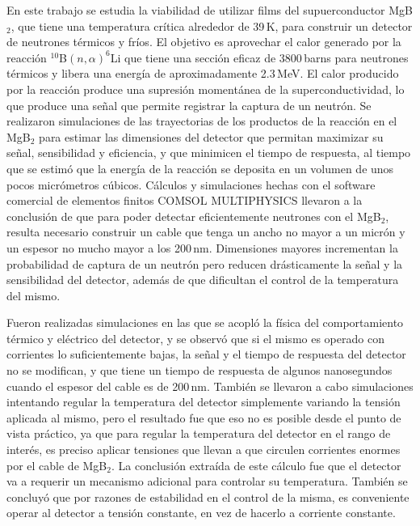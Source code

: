 \begin{resumen}%
  En este trabajo se estudia la viabilidad de utilizar films del supuerconductor MgB$_2$, que tiene una temperatura crítica alrededor de 39\,K, para construir un detector de neutrones térmicos y fríos. El objetivo es aprovechar el calor generado por la reacción $^{10}$B$(n,\alpha)^6$Li que tiene una sección eficaz de 3800\,barns para neutrones térmicos y libera una energía de aproximadamente 2.3\,MeV. El calor producido por la reacción produce una supresión momentánea de la superconductividad, lo que produce una señal que permite registrar la captura de un neutrón. Se realizaron simulaciones de las trayectorias de los productos de la reacción en el MgB$_2$ para estimar las dimensiones del detector que permitan maximizar su señal, sensibilidad y eficiencia, y que minimicen el tiempo de respuesta, al tiempo que se estimó que la energía de la reacción se deposita en un volumen de unos pocos micrómetros cúbicos. Cálculos y simulaciones hechas con el software comercial de elementos finitos COMSOL MULTIPHYSICS llevaron a la conclusión de que para poder detectar eficientemente neutrones con el MgB$_2$, resulta necesario construir un cable que tenga un ancho no mayor a un micrón y un espesor no mucho mayor a los 200\,nm. Dimensiones mayores incrementan la probabilidad de captura de un neutrón pero reducen drásticamente la señal y la sensibilidad del detector, además de que dificultan el control de la temperatura del mismo.

Fueron realizadas simulaciones en las que se acopló la física del comportamiento térmico y eléctrico del detector, y se observó que si el mismo es operado con corrientes lo suficientemente bajas, la señal y el tiempo de respuesta del detector no se modifican, y que tiene un tiempo de respuesta de algunos nanosegundos cuando el espesor del cable es de 200\,nm. También se llevaron a cabo simulaciones intentando regular la temperatura del detector simplemente variando la tensión aplicada al mismo, pero el resultado fue que eso no es posible desde el punto de vista práctico, ya que para regular la temperatura del detector en el rango de interés, es preciso aplicar tensiones que llevan a que circulen corrientes enormes por el cable de MgB$_2$. La conclusión extraída de este cálculo fue que el detector va a requerir un mecanismo adicional para controlar su temperatura. También se concluyó que por razones de estabilidad en el control de la misma, es conveniente operar al detector a tensión constante, en vez de hacerlo a corriente constante.


\end{resumen}
